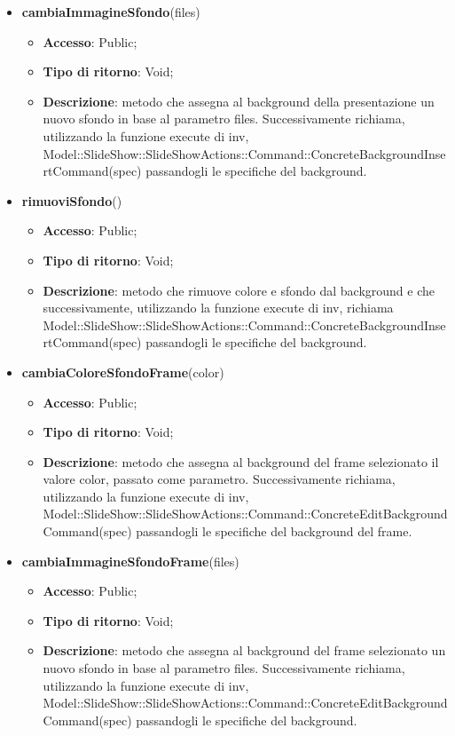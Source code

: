 {{\begin{itemize}
\begin{itemize}
		\end{itemize}
		\item \textbf{cambiaImmagineSfondo}(files)
		\begin{itemize}
			\item \textbf{Accesso}: Public;
			\item \textbf{Tipo di ritorno}: Void;
			\item \textbf{Descrizione}: metodo che assegna al background della presentazione un nuovo sfondo in base al parametro files. Successivamente richiama, utilizzando la funzione execute di inv, Model::\-SlideShow::\-SlideShowActions::\-Command::\-ConcreteBackgroundInsertCommand(spec) passandogli le specifiche del background.
		\end{itemize}
		\item \textbf{rimuoviSfondo}()
		\begin{itemize}
			\item \textbf{Accesso}: Public;
			\item \textbf{Tipo di ritorno}: Void;
			\item \textbf{Descrizione}: metodo che rimuove colore e sfondo dal background e che successivamente, utilizzando la funzione execute di inv, richiama Model::\-SlideShow::\-SlideShowActions::\-Command::\-ConcreteBackgroundInsertCommand(spec) passandogli le specifiche del background.
		\end{itemize}
		\item \textbf{cambiaColoreSfondoFrame}(color)
		\begin{itemize}
			\item \textbf{Accesso}: Public;
			\item \textbf{Tipo di ritorno}: Void;
			\item \textbf{Descrizione}: metodo che assegna al background del frame selezionato il valore color, passato come parametro. Successivamente richiama, utilizzando la funzione execute di inv, Model::\-SlideShow::\-SlideShowActions::\-Command::\-ConcreteEditBackgroundCommand(spec) passandogli le specifiche del background del frame.
		\end{itemize}
		\item \textbf{cambiaImmagineSfondoFrame}(files)
		\begin{itemize}
			\item \textbf{Accesso}: Public;
			\item \textbf{Tipo di ritorno}: Void;
			\item \textbf{Descrizione}: metodo che assegna al background del frame selezionato un nuovo sfondo in base al parametro files. Successivamente richiama, utilizzando la funzione execute di inv, Model::\-SlideShow::\-SlideShowActions::\-Command::\-ConcreteEditBackgroundCommand(spec) passandogli le specifiche del background.

\end{itemize}
\end{itemize}}}
